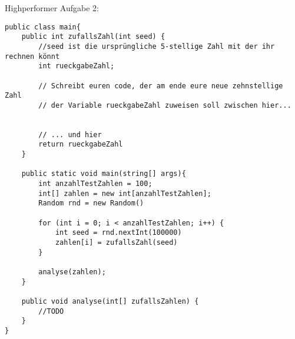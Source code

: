 \documentclass{../../sheet}
\begin{document}
\newpage
{}
Highperformer Aufgabe 2:
\begin{verbatim}
public class main{
    public int zufallsZahl(int seed) {
        //seed ist die ursprüngliche 5-stellige Zahl mit der ihr rechnen könnt
        int rueckgabeZahl;

        // Schreibt euren code, der am ende eure neue zehnstellige Zahl
        // der Variable rueckgabeZahl zuweisen soll zwischen hier...


        // ... und hier
        return rueckgabeZahl
    }

    public static void main(string[] args){
        int anzahlTestZahlen = 100;
        int[] zahlen = new int[anzahlTestZahlen];
        Random rnd = new Random()

        for (int i = 0; i < anzahlTestZahlen; i++) {
            int seed = rnd.nextInt(100000)
            zahlen[i] = zufallsZahl(seed)
        }

        analyse(zahlen);
    }

    public void analyse(int[] zufallsZahlen) {
        //TODO
    }
}
\end{verbatim}
\end{document}
